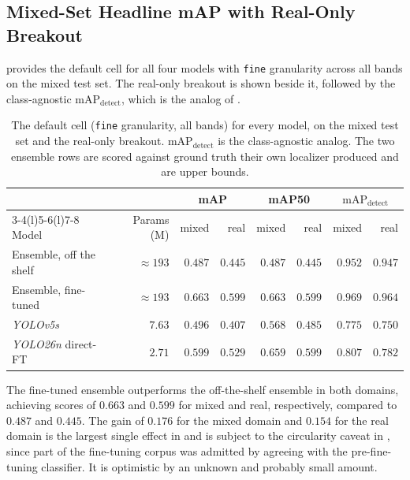 \subsection{Mixed-Set Headline mAP with Real-Only Breakout}\label{sec:results_headline_mixed}

 provides the default cell for all four models with \texttt{fine} granularity across all bands on the mixed test set. The real-only breakout is shown beside it, followed by the class-agnostic $\mathrm{mAP}_{\text{detect}}$, which is the analog of .

\begin{table}[htbp]
\centering
\caption[Headline accuracy of all four evaluated models]{The default cell (\texttt{fine} granularity, all bands) for every model, on the mixed test set and the real-only breakout. $\mathrm{mAP}_{\text{detect}}$ is the class-agnostic analog. The two ensemble rows are scored against ground truth their own localizer produced and are upper bounds.}
\label{tab:headline-cross-model}
\small
\begin{tabular}{@{}lrrrrrrr@{}}
\toprule
 & & \multicolumn{2}{c}{mAP} & \multicolumn{2}{c}{mAP50} & \multicolumn{2}{c}{$\mathrm{mAP}_{\text{detect}}$} \\
\cmidrule(l){3-4}\cmidrule(l){5-6}\cmidrule(l){7-8}
Model & Params (M) & mixed & real & mixed & real & mixed & real \\
\midrule
Ensemble, off the shelf & $\approx 193$ & $0.487$ & $0.445$ & $0.487$ & $0.445$ & $0.952$ & $0.947$ \\
Ensemble, fine-tuned & $\approx 193$ & $\mathbf{0.663}$ & $\mathbf{0.599}$ & $0.663$ & $0.599$ & $0.969$ & $0.964$ \\
\textit{YOLOv5s} & $7.63$ & $0.496$ & $0.407$ & $0.568$ & $0.485$ & $0.775$ & $0.750$ \\
\textit{YOLO26n} direct-FT & $2.71$ & $0.599$ & $0.529$ & $0.659$ & $0.599$ & $0.807$ & $0.782$ \\
\bottomrule
\end{tabular}
\end{table}

The fine-tuned ensemble outperforms the off-the-shelf ensemble in both domains, achieving scores of $0.663$ and $0.599$ for mixed and real, respectively, compared to $0.487$ and $0.445$. The gain of $0.176$ for the mixed domain and $0.154$ for the real domain is the largest single effect in  and is subject to the circularity caveat in , since part of the fine-tuning corpus was admitted by agreeing with the pre-fine-tuning classifier. It is optimistic by an unknown and probably small amount.

